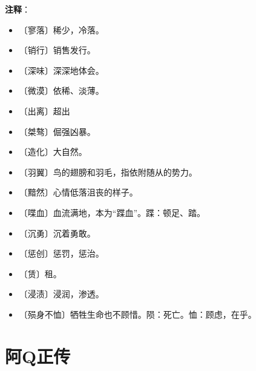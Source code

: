 \documentclass[12pt,UTF-8,openany]{ctexbook}
\begin{document}
\newpage

\textbf{注释}：

\vspace{-1em}

\begin{itemize}
    \setlength\itemsep{-0.2em}
    \item 〔寥落〕稀少，冷落。
    \item 〔销行〕销售发行。
    \item 〔深味〕深深地体会。
    \item 〔微漠〕依稀、淡薄。
    \item 〔出离〕超出
    \item 〔桀骜〕倔强凶暴。
    \item 〔造化〕大自然。
    \item 〔羽翼〕鸟的翅膀和羽毛，指依附随从的势力。
    \item 〔黯然〕心情低落沮丧的样子。
    \item 〔喋血〕血流满地，本为“蹀血”。蹀：顿足、踏。
    \item 〔沉勇〕沉着勇敢。
    \item 〔惩创〕惩罚，惩治。
    \item 〔赁〕租。
    \item 〔浸渍〕浸润，渗透。
    \item 〔殒身不恤〕牺牲生命也不顾惜。陨：死亡。恤：顾虑，在乎。
\end{itemize}

\chapter{阿Q正传}
\end{document}
